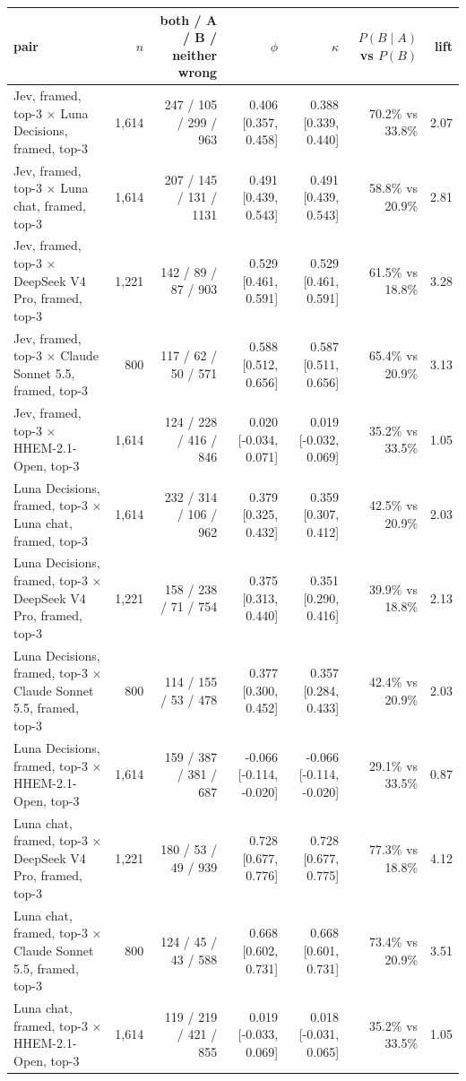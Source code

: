 \begin{tabular}{lrrrrrr}
\toprule
pair & $n$ & both / A / B / neither wrong & $\phi$ & $\kappa$ & $P(B \mid A)$ vs $P(B)$ & lift \\
\midrule
Jev, framed, top-3 $\times$ Luna Decisions, framed, top-3 & 1,614 & 247 / 105 / 299 / 963 & 0.406 [0.357, 0.458] & 0.388 [0.339, 0.440] & 70.2\% vs 33.8\% & 2.07 \\
Jev, framed, top-3 $\times$ Luna chat, framed, top-3 & 1,614 & 207 / 145 / 131 / 1131 & 0.491 [0.439, 0.543] & 0.491 [0.439, 0.543] & 58.8\% vs 20.9\% & 2.81 \\
Jev, framed, top-3 $\times$ DeepSeek V4 Pro, framed, top-3 & 1,221 & 142 / 89 / 87 / 903 & 0.529 [0.461, 0.591] & 0.529 [0.461, 0.591] & 61.5\% vs 18.8\% & 3.28 \\
Jev, framed, top-3 $\times$ Claude Sonnet 5.5, framed, top-3 & 800 & 117 / 62 / 50 / 571 & 0.588 [0.512, 0.656] & 0.587 [0.511, 0.656] & 65.4\% vs 20.9\% & 3.13 \\
Jev, framed, top-3 $\times$ HHEM-2.1-Open, top-3 & 1,614 & 124 / 228 / 416 / 846 & 0.020 [-0.034, 0.071] & 0.019 [-0.032, 0.069] & 35.2\% vs 33.5\% & 1.05 \\
Luna Decisions, framed, top-3 $\times$ Luna chat, framed, top-3 & 1,614 & 232 / 314 / 106 / 962 & 0.379 [0.325, 0.432] & 0.359 [0.307, 0.412] & 42.5\% vs 20.9\% & 2.03 \\
Luna Decisions, framed, top-3 $\times$ DeepSeek V4 Pro, framed, top-3 & 1,221 & 158 / 238 / 71 / 754 & 0.375 [0.313, 0.440] & 0.351 [0.290, 0.416] & 39.9\% vs 18.8\% & 2.13 \\
Luna Decisions, framed, top-3 $\times$ Claude Sonnet 5.5, framed, top-3 & 800 & 114 / 155 / 53 / 478 & 0.377 [0.300, 0.452] & 0.357 [0.284, 0.433] & 42.4\% vs 20.9\% & 2.03 \\
Luna Decisions, framed, top-3 $\times$ HHEM-2.1-Open, top-3 & 1,614 & 159 / 387 / 381 / 687 & -0.066 [-0.114, -0.020] & -0.066 [-0.114, -0.020] & 29.1\% vs 33.5\% & 0.87 \\
Luna chat, framed, top-3 $\times$ DeepSeek V4 Pro, framed, top-3 & 1,221 & 180 / 53 / 49 / 939 & 0.728 [0.677, 0.776] & 0.728 [0.677, 0.775] & 77.3\% vs 18.8\% & 4.12 \\
Luna chat, framed, top-3 $\times$ Claude Sonnet 5.5, framed, top-3 & 800 & 124 / 45 / 43 / 588 & 0.668 [0.602, 0.731] & 0.668 [0.601, 0.731] & 73.4\% vs 20.9\% & 3.51 \\
Luna chat, framed, top-3 $\times$ HHEM-2.1-Open, top-3 & 1,614 & 119 / 219 / 421 / 855 & 0.019 [-0.033, 0.069] & 0.018 [-0.031, 0.065] & 35.2\% vs 33.5\% & 1.05 \\

\end{tabular}
